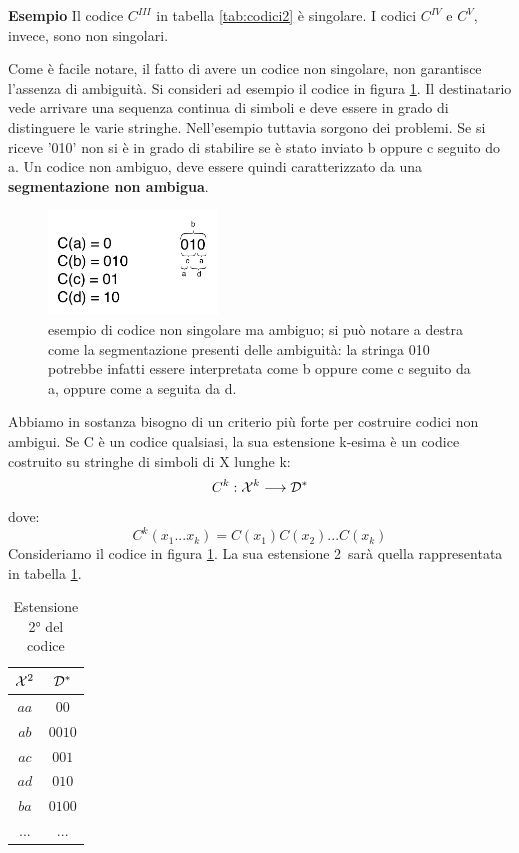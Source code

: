\noindent
\textbf{Esempio}
Il codice \(C^{III}\) in tabella \ref{tab:codici2} è singolare. I codici $C^{IV}$ e $C^{V}$, invece, sono non singolari.

\bigskip
\noindent
Come è facile notare, il fatto di avere un codice non singolare, non garantisce l'assenza di ambiguità. Si consideri ad esempio il codice in figura \ref{fig:codice3}. Il destinatario vede arrivare una sequenza continua di simboli e deve essere in grado di distinguere le varie stringhe. Nell'esempio tuttavia sorgono dei problemi. Se si riceve '010' non si è in grado di stabilire se è stato inviato b oppure c seguito do a. Un codice non ambiguo, deve essere quindi caratterizzato da una \textbf{segmentazione non ambigua}.

\begin{figure}[htbp]
\begin{center}
	\includegraphics[width=0.4\textwidth]{img/codice3.pdf}
\caption{esempio di codice non singolare ma ambiguo; si può notare a destra come la segmentazione presenti delle ambiguità: la stringa 010 potrebbe infatti essere interpretata come b oppure come c seguito da a, oppure come a seguita da d.}
\label{fig:codice3}
\end{center}
\end{figure}

Abbiamo in sostanza bisogno di un criterio più forte per costruire codici non ambigui.
Se C è un codice qualsiasi, la sua estensione k-esima è un codice costruito su stringhe di simboli di X lunghe k:
\[C^k: \mathcal{X}^k \longrightarrow \mathcal{D}^*\]
dove:
\[C^k(x_1... x_k) = C(x_1) C(x_2) ... C(x_k)\]
Consideriamo il codice in figura \ref{fig:codice3}. La sua estensione 2\textordfeminine \ sarà quella rappresentata in tabella \ref{tab:codice4}.

\begin{table}[htbp]
  \begin{center}
   \begin{tabular}{c|c}
	$\mathcal{X}^{2}$ & $ \mathcal{D}^{*}$ \\
       \hline
	$aa$ & $00$ \\ 
	$ab$ & $0010$ \\ 
	$ac$ & $001$ \\ 
        $ad$ & $010$ \\ 
        $ba$ & $0100$ \\ 
        $...$ & $...$ \\ 
    \end{tabular}
     
     \caption{Estensione 2° del codice}
    \label{tab:codice4}
  \end{center}
\end{table}

